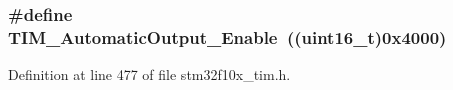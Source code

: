 \subsubsection[{\texorpdfstring{T\+I\+M\+\_\+\+Automatic\+Output\+\_\+\+Enable}{TIM_AutomaticOutput_Enable}}]{\setlength{\rightskip}{0pt plus 5cm}\#define T\+I\+M\+\_\+\+Automatic\+Output\+\_\+\+Enable~(({\bf uint16\+\_\+t})0x4000)}\hypertarget{group___t_i_m___a_o_e___bit___set___reset_gaa416873d01fe62fe8d3f9c8bb7853fa1}{}\label{group___t_i_m___a_o_e___bit___set___reset_gaa416873d01fe62fe8d3f9c8bb7853fa1}


Definition at line 477 of file stm32f10x\+\_\+tim.\+h.

